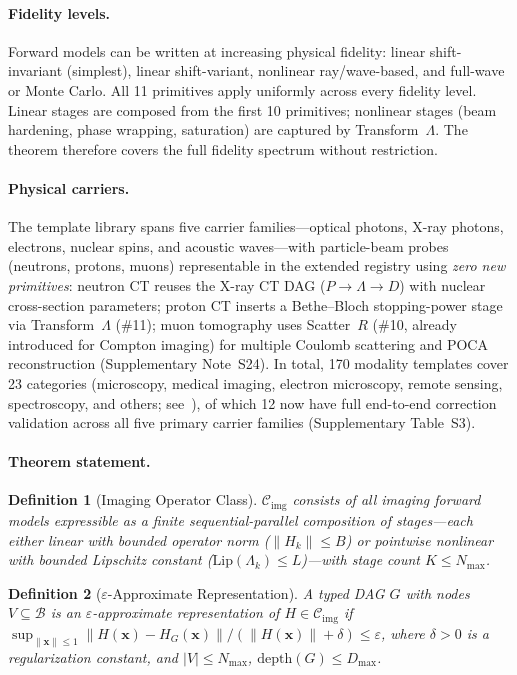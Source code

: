 \documentclass[11pt]{article}
\newtheorem{definition}{Definition}
\newcommand{\ctier}{\mathcal{C}_{\mathrm{img}}}
\newcommand{\Blib}{\mathcal{B}}
\newcommand{\Nmax}{N_{\max}}
\newcommand{\Dmax}{D_{\max}}
\newcommand{\Hdag}{H_{G}}
\begin{document}
\paragraph{Fidelity levels.}
Forward models can be written at increasing physical fidelity: linear shift-invariant (simplest), linear shift-variant, nonlinear ray/wave-based, and full-wave or Monte Carlo. All 11 primitives apply uniformly across every fidelity level. Linear stages are composed from the first 10 primitives; nonlinear stages (beam hardening, phase wrapping, saturation) are captured by Transform~$\Lambda$. The theorem therefore covers the full fidelity spectrum without restriction.

\paragraph{Physical carriers.}
The template library spans five carrier families---optical photons, X-ray photons, electrons, nuclear spins, and acoustic waves---with particle-beam probes (neutrons, protons, muons) representable in the extended registry using \emph{zero new primitives}: neutron CT reuses the X-ray CT DAG ($P \!\to\! \Lambda \!\to\! D$) with nuclear cross-section parameters; proton CT inserts a Bethe--Bloch stopping-power stage via Transform~$\Lambda$ (\#11); muon tomography uses Scatter~$R$ (\#10, already introduced for Compton imaging) for multiple Coulomb scattering and POCA reconstruction (Supplementary Note~S24). In total, 170 modality templates cover 23 categories (microscopy, medical imaging, electron microscopy, remote sensing, spectroscopy, and others; see~\cite{yang2026fpt}), of which 12 now have full end-to-end correction validation across all five primary carrier families (Supplementary Table~S3).

\paragraph{Theorem statement.}

\begin{definition}[Imaging Operator Class]
\label{def:ctier}
$\ctier$ consists of all imaging forward models expressible as a finite sequential-parallel composition of stages---each either linear with bounded operator norm ($\|H_k\| \leq B$) or pointwise nonlinear with bounded Lipschitz constant ($\mathrm{Lip}(\Lambda_k) \leq L$)---with stage count $K \leq \Nmax$.
\end{definition}

\begin{definition}[$\varepsilon$-Approximate Representation]
\label{def:eps}
A typed DAG $G$ with nodes $V \subseteq \Blib$ is an $\varepsilon$-approximate representation of $H \in \ctier$ if $\sup_{\|\mathbf{x}\|\leq 1} \|H(\mathbf{x}) - \Hdag(\mathbf{x})\| / (\|H(\mathbf{x})\| + \delta) \leq \varepsilon$, where $\delta > 0$ is a regularization constant, and $|V| \leq \Nmax$, $\mathrm{depth}(G) \leq \Dmax$.
\end{definition}
\end{document}
